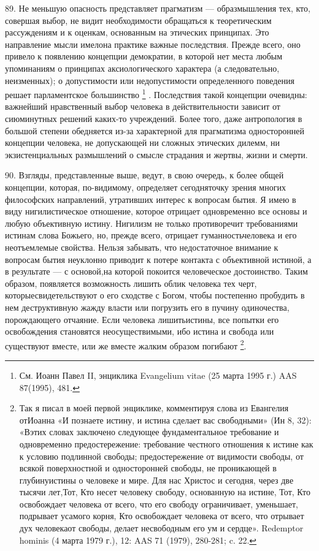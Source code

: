 \documentclass[a5paper,10pt]{article}
\begin{document}
89. Не меньшую опасность представляет прагматизм — образмышления тех, кто,
совершая выбор, не видит необходимости обращаться к теоретическим рассуждениям
и к оценкам, основанным на этических принципах. Это направление мысли имелона
практике важные последствия. Прежде всего, оно привело к появлению концепции
демократии, в которой нет места любым упоминаниям о принципах аксиологического
характера (а следовательно, неизменных); о допустимости или недопустимости
определенного поведения решает парламентское большинство \footnote{См. Иоанн
Павел II, энциклика Evangelium vitae (25 марта 1995 г.) AAS 87(1995), 481.} .
Последствия такой концепции очевидны: важнейший нравственный выбор человека в
действительности зависит от сиюминутных решений каких-то учреждений. Более
того, даже антропология в большой степени обедняется из-за характерной для
прагматизма односторонней концепции человека, не допускающей ни сложных
этических дилемм, ни экзистенциальных размышлений о смысле страдания и жертвы,
жизни и смерти.

90. Взгляды, представленные выше, ведут, в свою очередь, к более общей
концепции, которая, по-видимому, определяет сегодняточку зрения многих
философских направлений, утративших интерес к вопросам бытия. Я имею в виду
нигилистическое отношение, которое отрицает одновременно все основы и любую
объективную истину. Нигилизм не только противоречит требованиями истинам слова
Божьего, но, прежде всего, отрицает гуманностьчеловека и его неотъемлемые
свойства. Нельзя забывать, что недостаточное внимание к вопросам бытия
неуклонно приводит к потере контакта с объективной истиной, а в результате — с
основой,на которой покоится человеческое достоинство. Таким образом, появляется
возможность лишить облик человека тех черт, которыесвидетельствуют о его
сходстве с Богом, чтобы постепенно пробудить в нем деструктивную жажду власти
или погрузить его в пучину одиночества, порождающего отчаяние. Если человека
лишитьистины, все попытки его освобождения становятся неосуществимыми, ибо
истина и свобода или существуют вместе, или же вместе жалким образом
погибают \footnote{Так я писал в моей первой энциклике, комментируя слова из
Евангелия отИоанна «И познаете истину, и истина сделает вас свободными» (Ин 8,
32): «Вэтих словах заключено следующее фундаментальное требование и
одновременно предостережение: требование честного отношения к истине как к
условию подлинной свободы; предостережение от видимости свободы, от всякой
поверхностной и односторонней свободы, не проникающей в глубинуистины о
человеке и мире. Для нас Христос и сегодня, через две тысячи лет,Тот, Кто несет
человеку свободу, основанную на истине, Тот, Кто освобождает человека от всего,
что его свободу ограничивает, уменьшает, подрывает усамого корня, Кто
освобождает человека от всего, что отрывает дух человекаот свободы, делает
несвободным его ум и сердце». Redemptor hominis (4 марта 1979 г.), 12: AAS 71
(1979), 280-281; c. 22.}.
\end{document}

